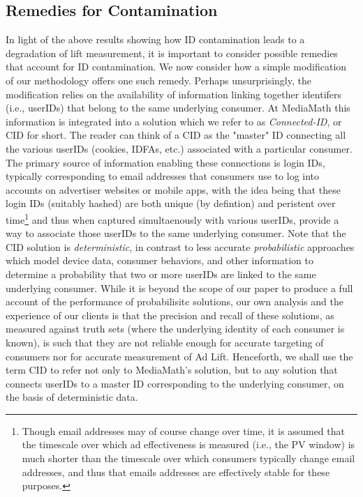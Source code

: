 \documentclass[11pt,a4paper]{article}
\theoremstyle{definition}
\theoremstyle{remark}
\theoremstyle{definition}
\theoremstyle{definition}
\theoremstyle{definition}
\theoremstyle{definition}
\theoremstyle{definition}
\theoremstyle{definition}
\begin{document}
\subsection{Remedies for Contamination}
In light of the above results showing how ID contamination leads to a degradation of lift measurement,  it is important to consider possible remedies that account for ID contamination. We now consider how a simple modification of our methodology offers one such remedy. Perhaps unsurprisingly, the modification relies on the availability of information linking together identifers (i.e., userIDs) that belong to the same underlying consumer. At MediaMath this information is integrated into a solution which we refer to as \textit{Connected-ID}, or CID for short. The reader can think of a CID as the "master" ID connecting all the various userIDs (cookies, IDFAs, etc.) associated with a particular consumer. The primary source of information enabling these connections is login IDs, typically corresponding to email addresses that consumers use to log into accounts on advertiser websites or mobile apps, with the idea being that these login IDs (suitably hashed) are both unique (by defintion) and peristent over time\footnote{Though email addresses may of course change over time, it is assumed that the timescale over which ad effectiveness is measured (i.e., the PV window) is much shorter than the timescale over which consumers typically change email addresses, and thus that emails addresses are effectively stable for these purposes.} and thus when captured simultaenously with various userIDs, provide a way to associate those userIDs to the same underlying consumer. Note that the CID solution is \textit{deterministic}, in contrast to less accurate \textit{probabilistic} approaches which model device data, consumer behaviors, and other information to determine a probability that two or more userIDs are linked to the same underlying consumer. While it is beyond the  scope of our paper to produce a full account of the performance of probabilisitc solutions, our own analysis and the experience of our clients is that the precision and recall of these solutions, as measured against truth sets (where the underlying identity of each consumer is known), is such that they are not reliable enough for accurate targeting of consumers nor for accurate measurement of Ad Lift. Henceforth, we shall use the term CID to refer not only to MediaMath's solution, but to any solution that connects userIDs to a master ID corresponding to the underlying consumer, on the basis of deterministic data.
\end{document}
